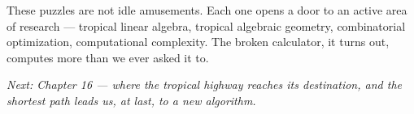 These puzzles are not idle amusements. Each one opens a door to an active area of research --- tropical linear algebra, tropical algebraic geometry, combinatorial optimization, computational complexity. The broken calculator, it turns out, computes more than we ever asked it to.



\emph{Next: Chapter 16 --- where the tropical highway reaches its destination, and the shortest path leads us, at last, to a new algorithm.}

